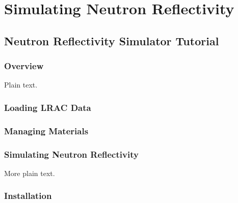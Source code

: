 \chapter{Simulating Neutron Reflectivity}

\section{Neutron Reflectivity Simulator Tutorial}

\subsection{Overview}

Plain text.

\subsection{Loading LRAC Data}
\subsection{Managing Materials}
\subsection{Simulating Neutron Reflectivity}

More plain text.

\subsection{Installation}
